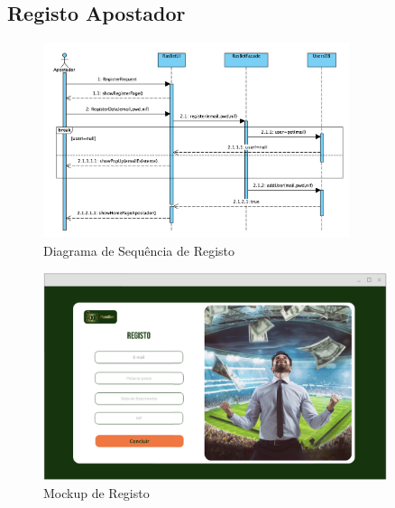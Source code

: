 \subsection{Registo Apostador}
\begin{figure}[H]
\centering
\includegraphics[width=0.8\textwidth]{imagens/ambitoProduto/SRegisto.png}
\caption{Diagrama de Sequência de Registo}
\end{figure}
\begin{figure}[H]
\centering
\includegraphics[width=0.9\textwidth]{imagens/ambitoProduto/Mockups/M_Registo.png}
\caption{Mockup de Registo}
\end{figure}

